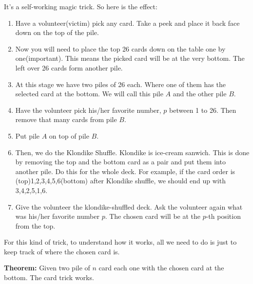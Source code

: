 \documentclass[a4paper, 12pt]{article}
\newcommand{\theorem}{\noindent\textbf{Theorem:} }
\theoremstyle{examplestyle}
\begin{document}
\begin{multicols}{2}
It's a self-working magic trick. So here is the effect:
\begin{enumerate}
	\item Have a volunteer(victim) pick any card. Take a peek and place it back face down on the top of the pile.
	\item Now you will need to place the top 26 cards down on the table one by one(important). This means the picked card will be at the very bottom. The left over 26 cards form another pile.
	\item At this stage we have two piles of 26 each. Where one of them has the selected card at the bottom. We will call this pile $A$ and the other pile $B$.
	\item Have the volunteer pick his/her favorite number, $p$ between 1 to 26. Then remove that many cards from pile $B$.
	\item Put pile $A$ on top of pile $B$.
	\item Then, we do the Klondike Shuffle. Klondike is ice-cream sanwich. This is done by removing the top and the bottom card as a pair and put them into another pile. Do this for the whole deck. For example, if the card order is (top)1,2,3,4,5,6(bottom) after Klondike shuffle, we should end up with 3,4,2,5,1,6.
	\item Give the volunteer the klondike-shuffled deck. Ask the volunteer again what was his/her favorite number $p$. The chosen card will be at the $p$-th position from the top.
\end{enumerate}

For this kind of trick, to understand how it works, all we need to do is just to keep track of where the chosen card is. 

\theorem Given two pile of $n$ card each one with the chosen card at the bottom. The card trick works.


\end{multicols}
\end{document}
